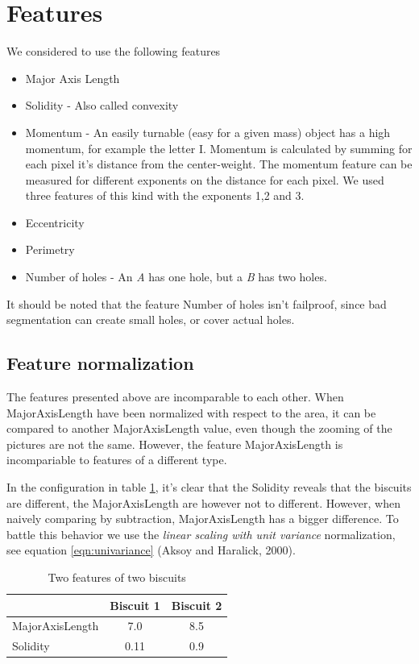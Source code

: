 \documentclass[a4paper,11pt]{article}
\begin{document}
\section{Features}
We considered to use the following features
\begin{itemize}
\item Major Axis Length
\item Solidity - Also called convexity
\item Momentum - An easily turnable (easy for a given mass) object has a high momentum, for example the letter I. Momentum is calculated by summing for each pixel it's distance from the center-weight. The momentum feature can be measured for different exponents on the distance for each pixel. We used three features of this kind with the exponents 1,2 and 3.
\item Eccentricity
\item Perimetry
\item Number of holes - An \emph{A} has one hole, but a \emph{B} has two holes.
\end{itemize}
It should be noted that the feature Number of holes isn't failproof,
since bad segmentation can create small holes, or cover actual holes.
\subsection{Feature normalization}
The features presented above are incomparable to each other.
When MajorAxisLength have been normalized with respect to the area, 
it can be compared to another MajorAxisLength value, 
even though the zooming of the pictures are not the same. 
However, the feature MajorAxisLength is incompariable to features of a different type.

In the configuration in table \ref{tab:features}, it's clear that the Solidity reveals that the biscuits
are different, the MajorAxisLength are however not to different.
However, when naively comparing by subtraction, MajorAxisLength has a bigger difference.
To battle this behavior we use the \emph{linear scaling with unit variance} normalization, see equation \ref{eqn:univariance} (Aksoy and Haralick, 2000).

\begin{table}[h!b!p!]
\caption{Two features of two biscuits}
\begin{center}
    \begin{tabular}{ l | c | c | }
                    & Biscuit 1 & Biscuit 2 \\ \hline
    MajorAxisLength & 7.0       & 8.5       \\ \hline
    Solidity        & 0.11      & 0.9       \\ \hline
    \end{tabular}
\end{center}
\label{tab:features}
\end{table}
\end{document}
